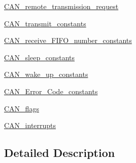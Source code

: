 \begin{DoxyCompactItemize}
\hyperlink{group___c_a_n__remote__transmission__request}{C\+A\+N\+\_\+remote\+\_\+transmission\+\_\+request}
\item 
\hyperlink{group___c_a_n__transmit__constants}{C\+A\+N\+\_\+transmit\+\_\+constants}
\item 
\hyperlink{group___c_a_n__receive___f_i_f_o__number__constants}{C\+A\+N\+\_\+receive\+\_\+\+F\+I\+F\+O\+\_\+number\+\_\+constants}
\item 
\hyperlink{group___c_a_n__sleep__constants}{C\+A\+N\+\_\+sleep\+\_\+constants}
\item 
\hyperlink{group___c_a_n__wake__up__constants}{C\+A\+N\+\_\+wake\+\_\+up\+\_\+constants}
\item 
\hyperlink{group___c_a_n___error___code__constants}{C\+A\+N\+\_\+\+Error\+\_\+\+Code\+\_\+constants}
\item 
\hyperlink{group___c_a_n__flags}{C\+A\+N\+\_\+flags}
\item 
\hyperlink{group___c_a_n__interrupts}{C\+A\+N\+\_\+interrupts}
\end{DoxyCompactItemize}


\subsection{Detailed Description}
